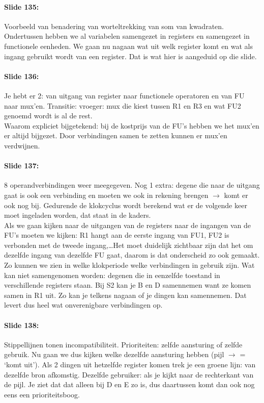 \documentclass[10pt,a4paper]{book}
\begin{document}
\paragraph{Slide 135:} Voorbeeld van benadering van worteltrekking van som van kwadraten. Ondertussen hebben we al variabelen samengezet in registers en samengezet in functionele eenheden. We gaan nu nagaan wat uit welk register komt en wat als ingang gebruikt wordt van een register. Dat is wat hier is aangeduid op die slide.

\paragraph{Slide 136:} Je hebt er 2: van uitgang van register naar functionele operatoren en van FU naar mux'en. Transitie: vroeger: mux die kiest tussen R1 en R3 en wat FU2 genoemd wordt is al de rest.\\
Waarom expliciet bijgetekend: bij de kostprijs van de FU's hebben we het mux'en er altijd bijgezet. Door verbindingen samen te zetten kunnen er mux'en verdwijnen.

\paragraph{Slide 137:} 8 operandverbindingen weer meegegeven. Nog 1 extra: degene die naar de uitgang gaat is ook een verbinding en moeten we ook in rekening brengen $\rightarrow$ komt er ook nog bij. Gedurende de klokcyclus wordt berekend wat er de volgende keer moet ingeladen worden, dat staat in de kaders.\\
Als we gaan kijken naar de uitgangen van de registers naar de ingangen van de FU's moeten we kijken: R1 hangt aan de eerste ingang van FU1, FU2 is verbonden met de tweede ingang,\ldots Het moet duidelijk zichtbaar zijn dat het om dezelfde ingang van dezelfde FU gaat, daarom is dat onderscheid zo ook gemaakt.\\
Zo kunnen we zien in welke klokperiode welke verbindingen in gebruik zijn. Wat kan niet samengenomen worden: degenen die in eenzelfde toestand in verschillende registers staan. Bij S2 kan je B en D samennemen want ze komen samen in R1 uit. Zo kan je telkens nagaan of je dingen kan samennemen. Dat levert dus heel wat onverenigbare verbindingen op.

\paragraph{Slide 138:} Stippellijnen tonen incompatibiliteit. Prioriteiten: zelfde aansturing of zelfde gebruik. Nu gaan we dus kijken welke dezelfde aansturing hebben (pijl $\rightarrow$ = `komt uit'). Als 2 dingen uit hetzelfde register komen trek je een groene lijn: van dezelfde bron afkomstig. Dezelfde gebruiker: als je kijkt naar de rechterkant van de pijl. Je ziet dat dat alleen bij D en E zo is, dus daartussen komt dan ook nog eens een prioriteitsboog.
\end{document}
